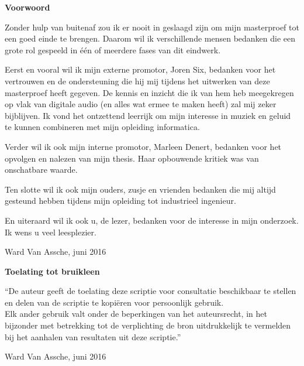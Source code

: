 
\newpage

\noindent \textbf{\huge Voorwoord}

\vspace{1.5cm}

\noindent

Zonder hulp van buitenaf zou ik er nooit in geslaagd zijn om mijn masterproef tot een goed einde te brengen. Daarom wil ik verschillende mensen bedanken die een grote rol gespeeld in één of meerdere fases van dit eindwerk.

Eerst en vooral wil ik mijn externe promotor, Joren Six, bedanken voor het vertrouwen en de ondersteuning die hij mij tijdens het uitwerken van deze masterproef heeft gegeven. De kennis en inzicht die ik van hem heb meegekregen op vlak van digitale audio (en alles wat ermee te maken heeft) zal mij zeker bijblijven. Ik vond het ontzettend leerrijk om mijn interesse in muziek en geluid te kunnen combineren met mijn opleiding informatica.

Verder wil ik ook mijn interne promotor, Marleen Denert, bedanken voor het opvolgen en nalezen van mijn thesis. Haar opbouwende kritiek was van onschatbare waarde.

Ten slotte wil ik ook mijn ouders, zusje en vrienden bedanken die mij altijd gesteund hebben tijdens mijn opleiding tot industrieel ingenieur.

En uiteraard wil ik ook u, de lezer, bedanken voor de interesse in mijn onderzoek. Ik wens u veel leesplezier.

\addvspace{2.5cm}

\noindent Ward Van Assche, juni 2016\newpage

\noindent \textbf{\huge Toelating tot bruikleen}

\vspace{1.5cm}

\noindent
``De auteur geeft de toelating deze scriptie voor consultatie beschikbaar
te stellen en delen van de scriptie te kopi\"eren voor persoonlijk
gebruik.\\
Elk ander gebruik valt onder de beperkingen van het auteursrecht,
in het bijzonder met betrekking tot de verplichting de bron uitdrukkelijk
te vermelden bij het aanhalen van resultaten uit deze scriptie.''

\addvspace{4cm}

\noindent Ward Van Assche, juni 2016
